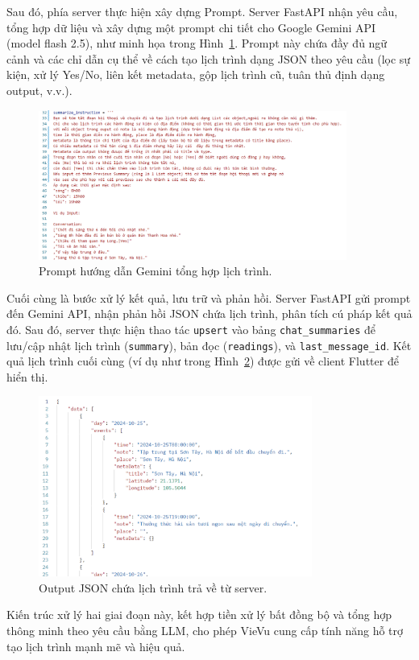Sau đó, phía server thực hiện xây dựng Prompt. Server FastAPI nhận yêu cầu, tổng hợp dữ liệu và xây dựng một prompt chi tiết cho Google Gemini API (model flash 2.5), như minh họa trong Hình~\ref{fig:prompt}. Prompt này chứa đầy đủ ngữ cảnh và các chỉ dẫn cụ thể về cách tạo lịch trình dạng JSON theo yêu cầu (lọc sự kiện, xử lý Yes/No, liên kết metadata, gộp lịch trình cũ, tuân thủ định dạng output, v.v.). %
    \begin{figure}[H]
        \centering
        \includegraphics[width=0.9\textwidth]{figures/c4/prompt2.png}
        \caption{Prompt hướng dẫn Gemini tổng hợp lịch trình.}
        \label{fig:prompt}
    \end{figure}

Cuối cùng là bước xử lý kết quả, lưu trữ và phản hồi. Server FastAPI gửi prompt đến Gemini API, nhận phản hồi JSON chứa lịch trình, phân tích cú pháp kết quả đó. Sau đó, server thực hiện thao tác \texttt{upsert} vào bảng \texttt{chat\_summaries} để lưu/cập nhật lịch trình (\texttt{summary}), bản đọc (\texttt{readings}), và \texttt{last\_message\_id}. Kết quả lịch trình cuối cùng (ví dụ như trong Hình~\ref{fig:output}) được gửi về client Flutter để hiển thị.
    \begin{figure}[H]
        \centering
        \includegraphics[width=0.8\textwidth]{figures/c4/output.png}
        \caption{Output JSON chứa lịch trình trả về từ server.}
        \label{fig:output}
    \end{figure}

Kiến trúc xử lý hai giai đoạn này, kết hợp tiền xử lý bất đồng bộ và tổng hợp thông minh theo yêu cầu bằng LLM, cho phép VieVu cung cấp tính năng hỗ trợ tạo lịch trình mạnh mẽ và hiệu quả.

